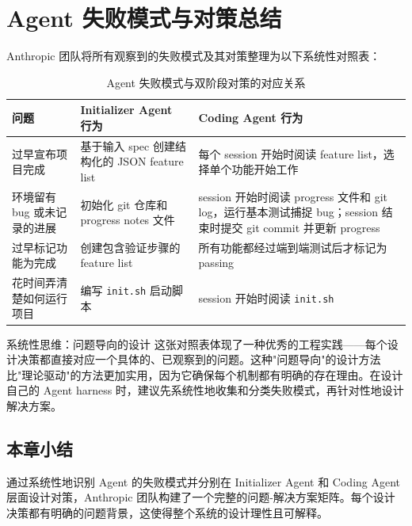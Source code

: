 \section{Agent 失败模式与对策总结}

Anthropic 团队将所有观察到的失败模式及其对策整理为以下系统性对照表：

\begin{table}[H]
\centering
\small
\begin{tabular}{p{3cm}p{4.5cm}p{5.5cm}}
\toprule
\textbf{问题} & \textbf{Initializer Agent 行为} & \textbf{Coding Agent 行为} \\
\midrule
过早宣布项目完成 & 基于输入 spec 创建结构化的 JSON feature list & 每个 session 开始时阅读 feature list，选择单个功能开始工作 \\
\midrule
环境留有 bug 或未记录的进展 & 初始化 git 仓库和 progress notes 文件 & session 开始时阅读 progress 文件和 git log，运行基本测试捕捉 bug；session 结束时提交 git commit 并更新 progress \\
\midrule
过早标记功能为完成 & 创建包含验证步骤的 feature list & 所有功能都经过端到端测试后才标记为 passing \\
\midrule
花时间弄清楚如何运行项目 & 编写 \texttt{init.sh} 启动脚本 & session 开始时阅读 \texttt{init.sh} \\
\bottomrule
\end{tabular}
\caption{Agent 失败模式与双阶段对策的对应关系}
\end{table}

\begin{importantbox}{系统性思维：问题导向的设计}
这张对照表体现了一种优秀的工程实践——每个设计决策都直接对应一个具体的、已观察到的问题。这种"问题导向"的设计方法比"理论驱动"的方法更加实用，因为它确保每个机制都有明确的存在理由。在设计自己的 Agent harness 时，建议先系统性地收集和分类失败模式，再针对性地设计解决方案。
\end{importantbox}

\subsection{本章小结}

通过系统性地识别 Agent 的失败模式并分别在 Initializer Agent 和 Coding Agent 层面设计对策，Anthropic 团队构建了一个完整的问题-解决方案矩阵。每个设计决策都有明确的问题背景，这使得整个系统的设计理性且可解释。


